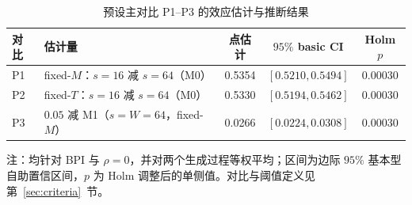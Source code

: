 \begin{table}[t]
\centering
\small
\caption{预设主对比 P1--P3 的效应估计与推断结果}\label{tab:primary}
\begin{tabular}{llccc}
\toprule
对比 & 估计量 & 点估计 & $95\%$ basic CI & Holm $p$\\
\midrule
P1 & fixed-$M$：$s{=}16$ 减 $s{=}64$（M0） & 0.5354 & $[0.5210,0.5494]$ & 0.00030\\
P2 & fixed-$T$：$s{=}16$ 减 $s{=}64$（M0） & 0.5330 & $[0.5194,0.5462]$ & 0.00030\\
P3 & $0.05$ 减 M1（$s{=}W{=}64$，fixed-$M$） & 0.0266 & $[0.0224,0.0308]$ & 0.00030\\
\bottomrule
\end{tabular}

\vspace{0.2em}
\begin{minipage}{0.95\textwidth}
\footnotesize 注：均针对 BPI 与 $\rho=0$，并对两个生成过程等权平均；区间为边际 $95\%$ 基本型自助置信区间，$p$ 为 Holm 调整后的单侧值。对比与阈值定义见第~\ref{sec:criteria}~节。
\end{minipage}
\end{table}
